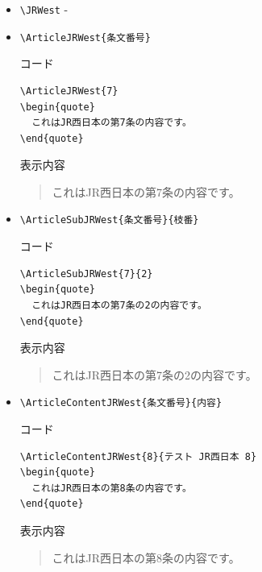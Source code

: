 \documentclass[oneside,10pt,a4paper]{jsarticle}
\begin{document}
  \begin{itemize}
    \item \verb|\JRWest| - \JRWest
    \item \verb|\ArticleJRWest{条文番号}|
      \begin{itembox}[l]{コード}
        \begin{verbatim}
\ArticleJRWest{7}
\begin{quote}
  これはJR西日本の第7条の内容です。
\end{quote}\end{verbatim}
      \end{itembox}
      \begin{itembox}[l]{表示内容}
        \begin{quote}
          これはJR西日本の第7条の内容です。
        \end{quote}
      \end{itembox}
    \item \verb|\ArticleSubJRWest{条文番号}{枝番}|
      \begin{itembox}[l]{コード}
        \begin{verbatim}
\ArticleSubJRWest{7}{2}
\begin{quote}
  これはJR西日本の第7条の2の内容です。
\end{quote}\end{verbatim}
      \end{itembox}
      \begin{itembox}[l]{表示内容}
        \begin{quote}
          これはJR西日本の第7条の2の内容です。
        \end{quote}
      \end{itembox}
    \newpage
    \item \verb|\ArticleContentJRWest{条文番号}{内容}|
      \begin{itembox}[l]{コード}
        \begin{verbatim}
\ArticleContentJRWest{8}{テスト JR西日本 8}
\begin{quote}
  これはJR西日本の第8条の内容です。
\end{quote}\end{verbatim}
      \end{itembox}
      \begin{itembox}[l]{表示内容}
        \begin{quote}
          これはJR西日本の第8条の内容です。
        \end{quote}

\end{itembox}
\end{itemize}
\end{document}

